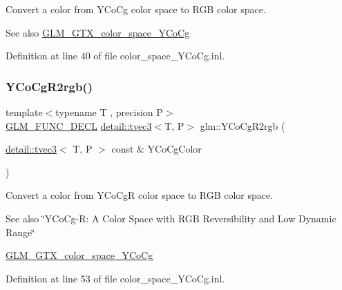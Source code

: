 Convert a color from Y\+Co\+Cg color space to R\+GB color space. \begin{DoxySeeAlso}{See also}
\hyperlink{group__gtx__color__space___y_co_cg}{G\+L\+M\+\_\+\+G\+T\+X\+\_\+color\+\_\+space\+\_\+\+Y\+Co\+Cg} 
\end{DoxySeeAlso}


Definition at line 40 of file color\+\_\+space\+\_\+\+Y\+Co\+Cg.\+inl.

\mbox{\label{group__gtx__color__space___y_co_cg_ga7b90b9b5758dbe96a82a2ef8237a17e9}} 
\subsubsection{\texorpdfstring{Y\+Co\+Cg\+R2rgb()}{YCoCgR2rgb()}}
{\footnotesize\ttfamily template$<$typename T , precision P$>$ \\
\hyperlink{setup_8hpp_ab2d052de21a70539923e9bcbf6e83a51}{G\+L\+M\+\_\+\+F\+U\+N\+C\+\_\+\+D\+E\+CL} \hyperlink{structglm_1_1detail_1_1tvec3}{detail\+::tvec3}$<$T, P$>$ glm\+::\+Y\+Co\+Cg\+R2rgb (\begin{DoxyParamCaption}\item[{\hyperlink{structglm_1_1detail_1_1tvec3}{detail\+::tvec3}$<$ T, P $>$ const \&}]{Y\+Co\+Cg\+Color }\end{DoxyParamCaption})}

Convert a color from Y\+Co\+CgR color space to R\+GB color space. \begin{DoxySeeAlso}{See also}
\char`\"{}\+Y\+Co\+Cg-\/\+R\+: A Color Space with R\+G\+B Reversibility and Low Dynamic Range\char`\"{} 

\hyperlink{group__gtx__color__space___y_co_cg}{G\+L\+M\+\_\+\+G\+T\+X\+\_\+color\+\_\+space\+\_\+\+Y\+Co\+Cg} 
\end{DoxySeeAlso}


Definition at line 53 of file color\+\_\+space\+\_\+\+Y\+Co\+Cg.\+inl.

